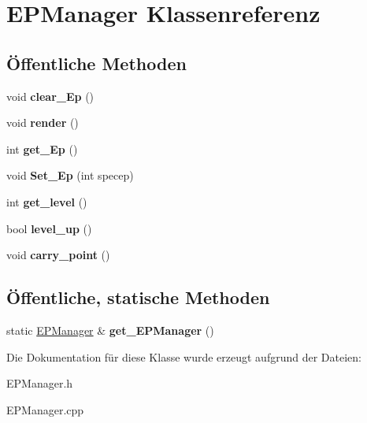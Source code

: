 \hypertarget{class_e_p_manager}{\section{E\-P\-Manager Klassenreferenz}
\label{class_e_p_manager}
}
\subsection*{Öffentliche Methoden}
\begin{DoxyCompactItemize}
\item 
\hypertarget{class_e_p_manager_ab16a464979242e27ab1de48a2fa8d193}{void {\bfseries clear\-\_\-\-Ep} ()}\label{class_e_p_manager_ab16a464979242e27ab1de48a2fa8d193}

\item 
\hypertarget{class_e_p_manager_ae0839a39f9ee6fd51d67faafbd6ff560}{void {\bfseries render} ()}\label{class_e_p_manager_ae0839a39f9ee6fd51d67faafbd6ff560}

\item 
\hypertarget{class_e_p_manager_aadec631b4cc9f5de5f4f8040aeeb1778}{int {\bfseries get\-\_\-\-Ep} ()}\label{class_e_p_manager_aadec631b4cc9f5de5f4f8040aeeb1778}

\item 
\hypertarget{class_e_p_manager_a300554dc6cd44d47ece8ebe6d8ed2daa}{void {\bfseries Set\-\_\-\-Ep} (int specep)}\label{class_e_p_manager_a300554dc6cd44d47ece8ebe6d8ed2daa}

\item 
\hypertarget{class_e_p_manager_af8b59848547dee1ab3967aaebcf8fc3a}{int {\bfseries get\-\_\-level} ()}\label{class_e_p_manager_af8b59848547dee1ab3967aaebcf8fc3a}

\item 
\hypertarget{class_e_p_manager_ad6ec1c64ea6b54f646bb793ad53e0279}{bool {\bfseries level\-\_\-up} ()}\label{class_e_p_manager_ad6ec1c64ea6b54f646bb793ad53e0279}

\item 
\hypertarget{class_e_p_manager_a1eac7449962fd356c97f588dbbf0e39e}{void {\bfseries carry\-\_\-point} ()}\label{class_e_p_manager_a1eac7449962fd356c97f588dbbf0e39e}

\end{DoxyCompactItemize}
\subsection*{Öffentliche, statische Methoden}
\begin{DoxyCompactItemize}
\item 
\hypertarget{class_e_p_manager_a7dd8287b28c4c0fc6e39e8846ee4bbc5}{static \hyperlink{class_e_p_manager}{E\-P\-Manager} \& {\bfseries get\-\_\-\-E\-P\-Manager} ()}\label{class_e_p_manager_a7dd8287b28c4c0fc6e39e8846ee4bbc5}

\end{DoxyCompactItemize}


Die Dokumentation für diese Klasse wurde erzeugt aufgrund der Dateien\-:\begin{DoxyCompactItemize}
\item 
E\-P\-Manager.\-h\item 
E\-P\-Manager.\-cpp\end{DoxyCompactItemize}
